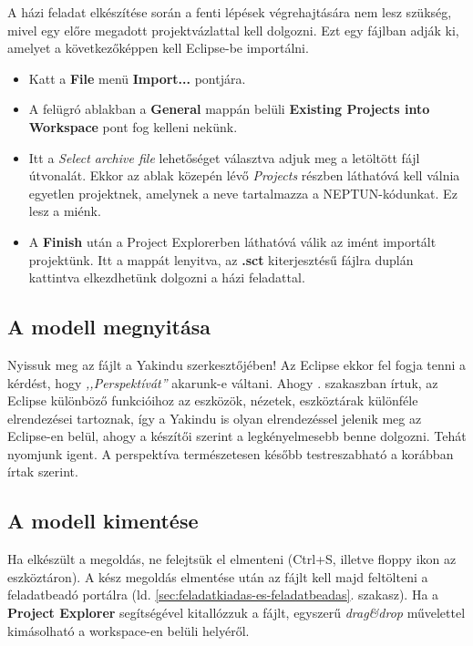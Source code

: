 A házi feladat elkészítése során a fenti lépések végrehajtására nem lesz szükség, mivel egy előre megadott projektvázlattal kell dolgozni. Ezt egy  fájlban adják ki, amelyet a következőképpen kell Eclipse-be importálni.

\begin{itemize}
	\item Katt a \textbf{File} menü \textbf{Import...} pontjára.
	\item A felügró ablakban a \textbf{General} mappán belüli \textbf{Existing Projects into Workspace} pont fog kelleni nekünk.
	\item Itt a \emph{Select archive file} lehetőséget választva adjuk meg a letöltött  fájl útvonalát. Ekkor az ablak közepén lévő \emph{Projects} részben láthatóvá kell válnia egyetlen projektnek, amelynek a neve tartalmazza a NEPTUN-kódunkat. Ez lesz a miénk.
	\item A \textbf{Finish} után a Project Explorerben láthatóvá válik az imént importált projektünk. Itt a mappát lenyitva, az \textbf{.sct} kiterjesztésű fájlra duplán kattintva elkezdhetünk dolgozni a házi feladattal.
\end{itemize}


\subsection{A modell megnyitása}

Nyissuk meg az  fájlt a Yakindu szerkesztőjében! Az Eclipse ekkor fel fogja tenni a kérdést, hogy \emph{,,Perspektívát''} akarunk-e váltani. Ahogy . szakaszban írtuk, az Eclipse különböző funkcióihoz az eszközök, nézetek, eszköztárak különféle elrendezései tartoznak, így a Yakindu is olyan elrendezéssel jelenik meg az Eclipse-en belül, ahogy a készítői szerint a legkényelmesebb benne dolgozni. Tehát nyomjunk igent. A perspektíva természetesen később testreszabható a korábban írtak szerint.

\subsection{A modell kimentése}
\label{sec:a-modell-kimentese}

Ha elkészült a megoldás, ne felejtsük el elmenteni (Ctrl+S, illetve floppy ikon az eszköztáron). A kész megoldás elmentése után az  fájlt kell majd feltölteni a feladatbeadó portálra (ld. \ref{sec:feladatkiadas-es-feladatbeadas}. szakasz). Ha a \textbf{Project Explorer} segítségével kitallózzuk a fájlt, egyszerű \emph{drag\&drop} művelettel kimásolható a workspace-en belüli helyéről.

